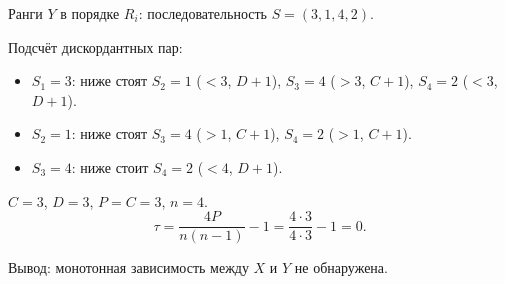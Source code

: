 Ранги $Y$ в порядке $R_i$: последовательность $S = (3, 1, 4, 2)$.

Подсчёт дискордантных пар:
\begin{itemize}
  \item $S_1 = 3$: ниже стоят $S_2=1$ ($<3$, $D{+}1$), $S_3=4$ ($>3$, $C{+}1$), $S_4=2$ ($<3$, $D{+}1$).
  \item $S_2 = 1$: ниже стоят $S_3=4$ ($>1$, $C{+}1$), $S_4=2$ ($>1$, $C{+}1$).
  \item $S_3 = 4$: ниже стоит $S_4=2$ ($<4$, $D{+}1$).
\end{itemize}

$C = 3$, $D = 3$, $P=C=3$, $n = 4$.
\[
  \tau = \frac{4P}{n(n-1)} - 1
       = \frac{4\cdot 3}{4\cdot 3} - 1 = 0.
\]

Вывод: монотонная зависимость между $X$ и $Y$ не обнаружена.

\clearpage
